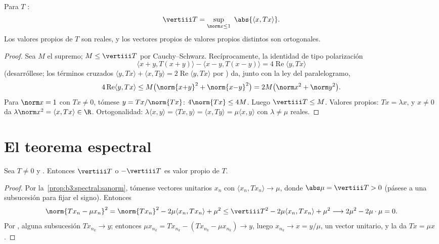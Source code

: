 \begin{proposition}\label{prop:b3:spectral:sanorm}
Para $T$ :
\[
\vertiii T = \sup_{\norm x \leq 1}\ \abs{\langle x,
Tx\rangle} .
\]
Los valores propios de $T$ son reales, y los vectores propios de valores
propios distintos son ortogonales.
\end{proposition}

\begin{proof}
Sea $M$ el supremo; $M \leq \vertiii T$ por Cauchy--Schwarz.
Recíprocamente, la identidad de tipo polarización
\[
\langle x{+}y, T(x{+}y)\rangle - \langle x{-}y,
T(x{-}y)\rangle = 4\operatorname{Re}\langle y, Tx\rangle
\]
(desarróllese; los términos cruzados $\langle y, Tx\rangle + \langle x,
Ty\rangle = 2\operatorname{Re}\langle y, Tx\rangle$ por
) da, junto con la
ley del paralelogramo,
\[
4\operatorname{Re}\langle y, Tx\rangle \leq
M\bigl(\norm{x{+}y}^2 + \norm{x{-}y}^2\bigr) = 2M\bigl(\norm
x^2 + \norm y^2\bigr).
\]
Para $\norm x = 1$ con $Tx \neq 0$, tómese $y = Tx/\norm{Tx}$:
$4\norm{Tx} \leq 4M$. Luego $\vertiii T \leq M$. Valores propios:
$Tx = \lambda x$, y $x \ne 0$ da $\lambda\norm x^2 = \langle
x, Tx\rangle \in \R$. Ortogonalidad: $\lambda\langle x,
y\rangle = \langle Tx, y\rangle = \langle x, Ty\rangle =
\mu\langle x, y\rangle$ con $\lambda \neq \mu$ reales.
\end{proof}

\section{El teorema espectral}

\begin{lemma}
\label{lem:b3:spectral:existence}
Sea $T \neq 0$  y
. Entonces $\vertiii T$
o $-\vertiii T$ es valor propio de $T$.
\end{lemma}

\begin{proof}
Por la~\cref{prop:b3:spectral:sanorm}, tómense vectores unitarios $x_n$
con $\langle x_n, Tx_n\rangle \to \mu$, donde $\abs\mu =
\vertiii T > 0$ (pásese a una subsucesión para fijar el signo). Entonces
\[
\norm{Tx_n - \mu x_n}^2
= \norm{Tx_n}^2 - 2\mu\langle x_n, Tx_n\rangle + \mu^2
\leq \vertiii T^2 - 2\mu\langle x_n, Tx_n\rangle + \mu^2
\longrightarrow 2\mu^2 - 2\mu\cdot\mu = 0 .
\]
Por , alguna subsucesión $Tx_{n_k} \to y$; entonces $\mu
x_{n_k} = Tx_{n_k} - (Tx_{n_k} - \mu x_{n_k}) \to y$, luego
$x_{n_k} \to x = y/\mu$, un vector unitario, y la
 da
$Tx = \mu x$.
\end{proof}

